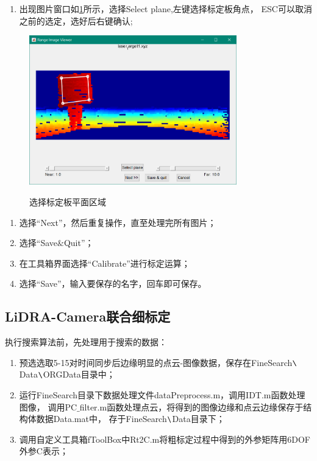 \begin{enumerate}[$\star$]
\item 出现图片窗口如\figurename\ref{fig: pic10}所示，选择Select plane,左键选择标定板角点，
ESC可以取消之前的选定，选好后右键确认;
\end{enumerate}

\begin{figure}[htbp]
    \centering
    \includegraphics[width=9cm]{pic/10.png} \\
    \caption{选择标定板平面区域}\label{fig: pic10}
\end{figure}

\begin{enumerate}[$\star$]
\item 选择“Next”，然后重复操作，直至处理完所有图片；
\item 选择“Save$\&$Quit”；
\item 在工具箱界面选择“Calibrate”进行标定运算；
\item 选择“Save”，输入要保存的名字，回车即可保存。
\end{enumerate}

\subsection{LiDRA-Camera联合细标定}
执行搜索算法前，先处理用于搜索的数据：
\begin{enumerate}[$\star$]
\item 预选选取5-15对时间同步后边缘明显的点云-图像数据，保存在FineSearch$\verb|\|$Data$\verb|\|$ORGData目录中；
\item 运行FineSearch目录下数据处理文件dataPreprocess.m，调用IDT.m函数处理图像，
调用PC$\_$filter.m函数处理点云，将得到的图像边缘和点云边缘保存于结构体数据Data.mat中，
存于FineSearch$\verb|\|$Data目录下；
\item 调用自定义工具箱fToolBox中Rt2C.m将粗标定过程中得到的外参矩阵用6DOF外参C表示；
\end{enumerate}

